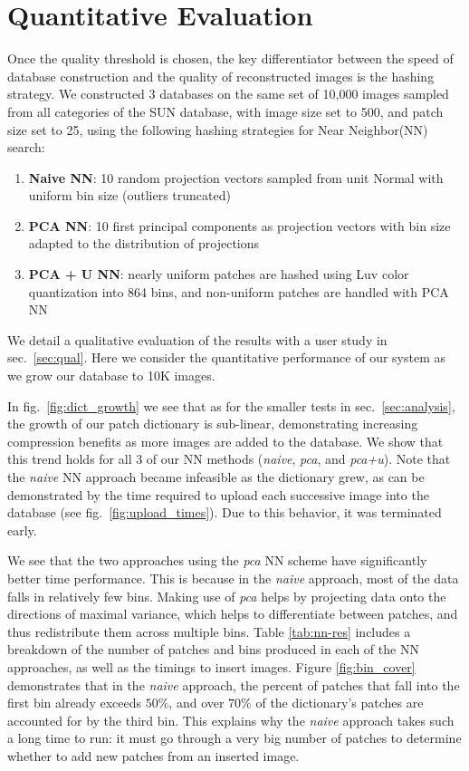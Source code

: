 \section{Quantitative Evaluation}\label{sec:performance}

Once the quality threshold is chosen, the key differentiator
between the speed of database construction and the quality of
reconstructed images is the hashing strategy.
We constructed 3 databases on the same set of
10,000 images sampled
from all categories of the SUN database, with image size
set to 500, and patch size set to 25, using the following
hashing strategies for Near Neighbor(NN) search:
\begin{enumerate}
\item \textbf{Naive NN}: 10 random projection vectors sampled from unit Normal with
uniform bin size (outliers truncated)
\item \textbf{PCA NN}: 10 first principal components as projection vectors with
bin size adapted to the distribution of projections
\item \textbf{PCA + U NN}: nearly uniform patches are hashed using Luv color
quantization into 864 bins, and non-uniform patches are handled with PCA NN
\end{enumerate}
We detail a qualitative evaluation of the results with a user study in sec.~\ref{sec:qual}.
Here we consider the quantitative performance of our system as we grow our database to 10K images.

In fig.~\ref{fig:dict_growth} we see that as for the smaller tests in sec.~\ref{sec:analysis}, the growth of our patch dictionary is sub-linear, demonstrating increasing compression benefits as more images are added to the database. We show that this trend holds for all 3 of our NN methods (\emph{naive}, \emph{pca}, and \emph{pca+u}). Note that the \emph{naive} NN approach became infeasible as the dictionary grew, as can be demonstrated by the time required to upload each successive image into the database (see fig.~\ref{fig:upload_times}). Due to this behavior, it was terminated early.

We see that the two approaches using the \emph{pca} NN scheme have significantly better time performance. This is because in the \emph{naive} approach, most of the data falls in relatively few bins. Making use of \emph{pca} helps by projecting data onto the directions of maximal variance, which helps to differentiate between patches, and thus redistribute them across multiple bins. Table \ref{tab:nn-res} includes a breakdown of the number of patches and bins produced in each of the NN approaches, as well as the timings to insert images. Figure \ref{fig:bin_cover} demonstrates that in the \emph{naive} approach, the percent of patches that fall into the first bin already exceeds $50\%$, and over $70\%$ of the dictionary's patches are accounted for by the third bin. This explains why the \emph{naive} approach takes such a long time to run: it must go through a very big number of patches to determine whether to add new patches from an inserted image.

